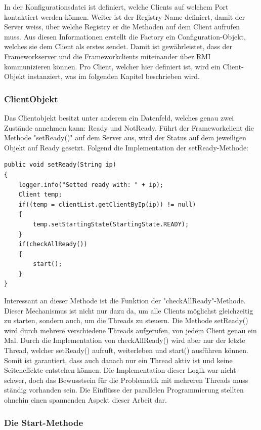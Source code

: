 In der Konfigurationsdatei ist definiert, welche Clients auf welchem Port kontaktiert werden können. Weiter ist der Registry-Name definiert, damit der Server weiss, über welche Registry er die Methoden auf dem Client aufrufen muss. \newline
Aus diesen Informationen erstellt die Factory ein Configuration-Objekt, welches sie dem Client als erstes sendet. Damit ist gewährleistet, dass der Frameworkserver und die Frameworkclients miteinander über RMI kommunizieren können. \newline
Pro Client, welcher hier definiert ist, wird ein Client-Objekt instanziert, was im folgenden Kapitel beschrieben wird.

\subsubsection{ClientObjekt}
\label{sec:ClientObjekt}

Das Clientobjekt besitzt unter anderem ein Datenfeld, welches genau zwei Zustände annehmen kann: Ready und NotReady. Führt der Frameworkclient die Methode "setReady()" auf dem Server aus, wird der Status auf dem jeweiligen Objekt auf Ready gesetzt. Folgend die Implementation der setReady-Methode:
\begin{lstlisting}
public void setReady(String ip) 
{
	logger.info("Setted ready with: " + ip);
	Client temp;
	if((temp = clientList.getClientByIp(ip)) != null)
	{
		temp.setStartingState(StartingState.READY);
	}
	if(checkAllReady())
	{
		start();
	}
}
\end{lstlisting}

Interessant an dieser Methode ist die Funktion der "checkAllReady"-Methode. Dieser Mechanismus ist nicht nur dazu da, um alle Clients möglichst gleichzeitig zu starten, sondern auch, um die Threads zu steuern. Die Methode setReady() wird durch mehrere verschiedene Threads aufgerufen, von jedem Client genau ein Mal. Durch die Implementation von checkAllReady() wird aber nur der letzte Thread, welcher setReady() aufruft, weiterleben und start() ausführen können. Somit ist garantiert, dass auch danach nur ein Thread aktiv ist und keine Seiteneffekte entstehen können.\newline
Die Implementation dieser Logik war nicht schwer, doch das Bewusstsein für die Problematik mit mehreren Threads muss ständig vorhanden sein. Die Einflüsse der parallelen Programmierung stellten ohnehin einen spannenden Aspekt dieser Arbeit dar. 

\subsubsection{Die Start-Methode}
\label{sec:startMethode}

